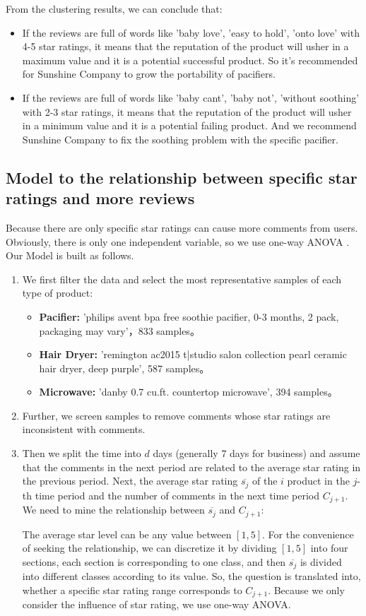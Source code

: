 \documentclass{mcmthesis}
\begin{document}
From the clustering results, we can conclude that:
\begin{itemize}
	\item If the reviews are full of words like 'baby love', 'easy to hold', 'onto love' with 4-5 star ratings, it means that the reputation of the product will usher in a maximum value and it is a potential successful product. So it's recommended for Sunshine Company to grow the portability of pacifiers.
	\item If the reviews are full of words like 'baby cant', 'baby not', 'without soothing' with 2-3 star ratings, it means that the reputation of the product will usher in a minimum value and it is a potential failing product. And we recommend Sunshine Company to fix the soothing problem with the specific pacifier.
\end{itemize}
\subsection{Model to the relationship between specific star ratings and more reviews}
Because there are only specific star ratings can cause more comments from users. Obviously, there is only one independent variable, so we use one-way ANOVA \cite{ross2017one}. Our Model is built as follows.\\
\begin{enumerate}
	\item We first filter the data and select the most representative samples of each type of product:
	\begin{itemize}
		\item \textbf{Pacifier: }'philips avent bpa free soothie pacifier, 0-3 months, 2 pack, packaging may vary'，833 samples。
		\item \textbf{Hair Dryer: }'remington ac2015 t|studio salon collection pearl ceramic hair dryer, deep purple', 587 samples。
		\item \textbf{Microwave: }'danby 0.7 cu.ft. countertop microwave', 394 samples。
	\end{itemize}
	\item Further, we screen samples to remove comments whose star ratings are inconsistent with comments.
	\item Then we split the time into $d $ days (generally 7 days for business) and assume that the comments in the next period are related to the average star rating in the previous period. Next, the average star rating $\overline{s_j} $ of the $i $ product in the $j$-th time period and the number of comments in the next time period $C_{j + 1} $. We need to mine the relationship between $\overline{s_j} $ and $C_{j + 1} $:

	The average star level can be any value between $[1,5] $. For the convenience of seeking the relationship, we can discretize it by dividing $[1,5] $ into four sections, each section is corresponding to one class, and then $\overline{s_j} $ is divided into different classes according to its value. So, the question is translated into, whether a specific star rating range corresponds to $C_{j + 1} $. Because we only consider the influence of star rating, we use one-way ANOVA.
\end{enumerate}
\end{document}
